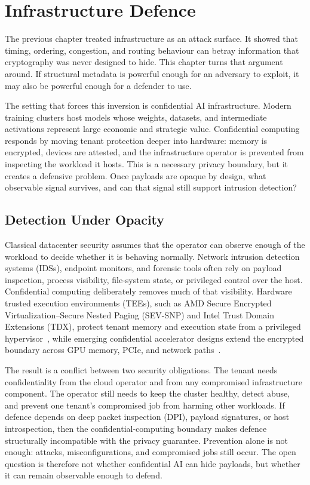 \chapter{Infrastructure Defence}
\label{ch:confidential-ai}

The previous chapter treated infrastructure as an attack surface. It showed that timing, ordering, congestion, and routing behaviour can betray information that cryptography was never designed to hide. This chapter turns that argument around. If structural metadata is powerful enough for an adversary to exploit, it may also be powerful enough for a defender to use.

The setting that forces this inversion is confidential AI infrastructure. Modern training clusters host models whose weights, datasets, and intermediate activations represent large economic and strategic value. Confidential computing responds by moving tenant protection deeper into hardware: memory is encrypted, devices are attested, and the infrastructure operator is prevented from inspecting the workload it hosts. This is a necessary privacy boundary, but it creates a defensive problem. Once payloads are opaque by design, what observable signal survives, and can that signal still support intrusion detection?

\section{Detection Under Opacity}
\label{sec:conf-dilemma}

Classical datacenter security assumes that the operator can observe enough of the workload to decide whether it is behaving normally. Network intrusion detection systems (IDSs), endpoint monitors, and forensic tools often rely on payload inspection, process visibility, file-system state, or privileged control over the host. Confidential computing deliberately removes much of that visibility. Hardware trusted execution environments (TEEs), such as AMD Secure Encrypted Virtualization--Secure Nested Paging (SEV-SNP) and Intel Trust Domain Extensions (TDX), protect tenant memory and execution state from a privileged hypervisor~\cite{amdsevsnp2020,inteltdx}, while emerging confidential accelerator designs extend the encrypted boundary across GPU memory, PCIe, and network paths~\cite{nvidiahoppercc}.

The result is a conflict between two security obligations. The tenant needs confidentiality from the cloud operator and from any compromised infrastructure component. The operator still needs to keep the cluster healthy, detect abuse, and prevent one tenant's compromised job from harming other workloads. If defence depends on deep packet inspection (DPI), payload signatures, or host introspection, then the confidential-computing boundary makes defence structurally incompatible with the privacy guarantee. Prevention alone is not enough: attacks, misconfigurations, and compromised jobs still occur. The open question is therefore not whether confidential AI can hide payloads, but whether it can remain observable enough to defend.

